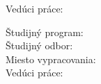 


Vedúci práce: \FIITsupervisor \\

\medskip{}

\FIITdate

\newpage
\thispagestyle{empty}
\mbox{}
\newpage


Študijný program: \FIITstudyProgramSlovak \\
Študijný odbor: \FIITstudyFieldSlovak \\
Miesto vypracovania: \FIITtrainingWorkplaceSlovak \\
Vedúci práce: \FIITsupervisor \\

\medskip{}

\FIITdate

\newpage
\thispagestyle{empty}
\mbox{}
% 







